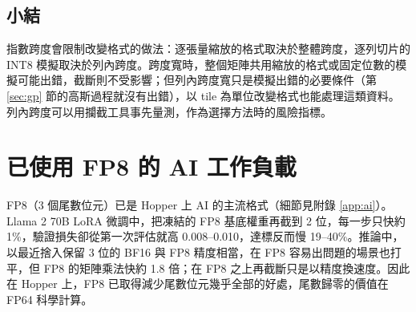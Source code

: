 \subsection{小結}

指數跨度會限制改變格式的做法：逐張量縮放的格式取決於整體跨度，逐列切片的 INT8 模擬取決於列內跨度。跨度寬時，整個矩陣共用縮放的格式或固定位數的模擬可能出錯，截斷則不受影響；但列內跨度寬只是模擬出錯的必要條件（第 \ref{sec:gp} 節的高斯過程就沒有出錯），以 tile 為單位改變格式也能處理這類資料。列內跨度可以用攔截工具事先量測，作為選擇方法時的風險指標。

\section{已使用 FP8 的 AI 工作負載}\label{sec:ai}

FP8（3 個尾數位元）已是 Hopper 上 AI 的主流格式（細節見附錄 \ref{app:ai}）。Llama 2 70B LoRA 微調中，把凍結的 FP8 基底權重再截到 2 位，每一步只快約 1\%，驗證損失卻從第一次評估就高 0.008–0.010，達標反而慢 19–40\%。推論中，以最近捨入保留 3 位的 BF16 與 FP8 精度相當，在 FP8 容易出問題的場景也打平，但 FP8 的矩陣乘法快約 1.8 倍；在 FP8 之上再截斷只是以精度換速度。因此在 Hopper 上，FP8 已取得減少尾數位元幾乎全部的好處，尾數歸零的價值在 FP64 科學計算。

